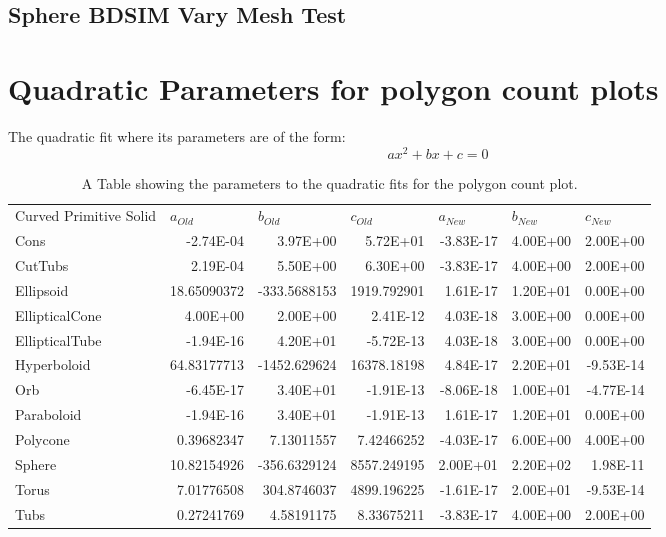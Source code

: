 \documentclass[12pt,a4paper]{article}
\begin{document}
\subsection{Sphere BDSIM Vary Mesh Test}
\label{ap1}



\small
%

\newpage
\section{Quadratic Parameters for polygon count plots}
\label{appp1}
The quadratic fit where its parameters are of the form:
\begin{equation}
ax^2 + bx + c = 0
\end{equation}
\begin{table}[h!]
  \small
  \centering
  \caption{A Table showing the parameters to the quadratic fits for the polygon count plot.}
    \begin{tabular}{lrrrrrr}
    Curved Primitive Solid & \multicolumn{1}{l}{$a_{Old}$} & \multicolumn{1}{l}{$b_{Old}$} & \multicolumn{1}{l}{$c_{Old}$} & \multicolumn{1}{l}{$a_{New}$} & \multicolumn{1}{l}{$b_{New}$} & \multicolumn{1}{l}{$c_{New}$} \\
    Cons  & -2.74E-04 & 3.97E+00 & 5.72E+01 & -3.83E-17 & 4.00E+00 & 2.00E+00 \\
    CutTubs & 2.19E-04 & 5.50E+00 & 6.30E+00 & -3.83E-17 & 4.00E+00 & 2.00E+00 \\
    Ellipsoid & 18.65090372 & -333.5688153 & 1919.792901 & 1.61E-17 & 1.20E+01 & 0.00E+00 \\
    EllipticalCone & 4.00E+00 & 2.00E+00 & 2.41E-12 & 4.03E-18 & 3.00E+00 & 0.00E+00 \\
    EllipticalTube & -1.94E-16 & 4.20E+01 & -5.72E-13 & 4.03E-18 & 3.00E+00 & 0.00E+00 \\
    Hyperboloid & 64.83177713 & -1452.629624 & 16378.18198 & 4.84E-17 & 2.20E+01 & -9.53E-14 \\
    Orb   & -6.45E-17 & 3.40E+01 & -1.91E-13 & -8.06E-18 & 1.00E+01 & -4.77E-14 \\
    Paraboloid & -1.94E-16 & 3.40E+01 & -1.91E-13 & 1.61E-17 & 1.20E+01 & 0.00E+00 \\
    Polycone & 0.39682347 & 7.13011557 & 7.42466252 & -4.03E-17 & 6.00E+00 & 4.00E+00 \\
    Sphere & 10.82154926 & -356.6329124 & 8557.249195 & 2.00E+01 & 2.20E+02 & 1.98E-11 \\
    Torus & 7.01776508 & 304.8746037 & 4899.196225 & -1.61E-17 & 2.00E+01 & -9.53E-14 \\
    Tubs  & 0.27241769 & 4.58191175 & 8.33675211 & -3.83E-17 & 4.00E+00 & 2.00E+00 \\
    \end{tabular}%
  \label{tab1}%
\end{table}
\end{document}
